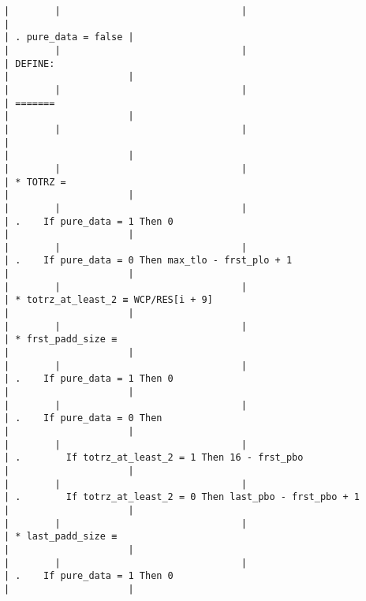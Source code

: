 \documentclass[varwidth=\maxdimen,margin=0.5cm,multi={verbatim}]{standalone}
\begin{document}
\begin{verbatim}
|        |                                |                                       |                                                                      | . pure_data = false |
|        |                                |                                       | DEFINE:                                                              |                     |
|        |                                |                                       | =======                                                              |                     |
|        |                                |                                       |                                                                      |                     |
|        |                                |                                       | * TOTRZ =                                                            |                     |
|        |                                |                                       | .    If pure_data = 1 Then 0                                         |                     |
|        |                                |                                       | .    If pure_data = 0 Then max_tlo - frst_plo + 1                    |                     |
|        |                                |                                       | * totrz_at_least_2 ≡ WCP/RES[i + 9]                                  |                     |
|        |                                |                                       | * frst_padd_size ≡                                                   |                     |
|        |                                |                                       | .    If pure_data = 1 Then 0                                         |                     |
|        |                                |                                       | .    If pure_data = 0 Then                                           |                     |
|        |                                |                                       | .        If totrz_at_least_2 = 1 Then 16 - frst_pbo                  |                     |
|        |                                |                                       | .        If totrz_at_least_2 = 0 Then last_pbo - frst_pbo + 1        |                     |
|        |                                |                                       | * last_padd_size ≡                                                   |                     |
|        |                                |                                       | .    If pure_data = 1 Then 0                                         |                     |

\end{verbatim}
\end{document}
